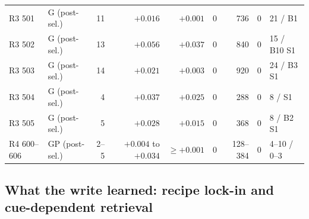 \documentclass{article}
\begin{document}
\begin{table}[t]
\begin{tabular}{llrrrrrrl}
R3 501 & G (post-sel.) & 11 & $+0.016$ & $+0.001$ & 0 & 736 & 0 & 21 / B1 \\
R3 502 & G (post-sel.) & 13 & $+0.056$ & $+0.037$ & 0 & 840 & 0 & 15 / B10 S1 \\
R3 503 & G (post-sel.) & 14 & $+0.021$ & $+0.003$ & 0 & 920 & 0 & 24 / B3 S1 \\
R3 504 & G (post-sel.) & 4 & $+0.037$ & $+0.025$ & 0 & 288 & 0 & 8 / S1 \\
R3 505 & G (post-sel.) & 5 & $+0.028$ & $+0.015$ & 0 & 368 & 0 & 8 / B2 S1 \\
R4 600--606 & GP (post-sel.) & 2--5 & $+0.004$ to $+0.034$ & $\ge +0.001$ & 0 & 128--384 & 0 & 4--10 / 0--3 \\
\bottomrule
\end{tabular}
\end{table}

\subsection{What the write learned: recipe lock-in and cue-dependent retrieval}
\label{sec:storage}

\end{document}
